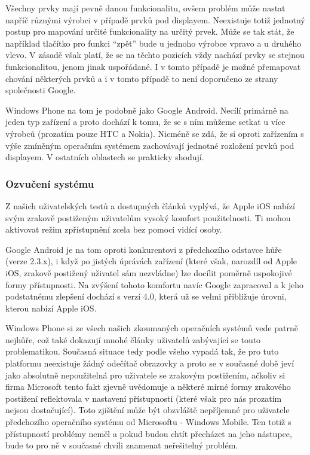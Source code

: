 \documentclass[thesis=M,czech]{FITthesis}[2012/06/26]
\begin{document}
Všechny prvky mají pevně danou funkcionalitu, ovšem problém může nastat napříč různými výrobci v případě prvků pod displayem. Neexistuje totiž jednotný postup pro mapování určité funkcionality na určitý prvek. Může se tak stát, že například tlačítko pro funkci “zpět” bude u jednoho výrobce vpravo a u druhého vlevo. V zásadě však platí, že se na těchto pozicích vždy nachází prvky se stejnou funkcionalitou, jenom jinak uspořádané. I v tomto případě je možné přemapovat chování některých prvků a i v tomto případě to není doporučeno ze strany společnosti Google.

Windows Phone na tom je podobně jako Google Android. Necílí primárně na jeden typ zařízení a proto dochází k tomu, že se s ním můžeme setkat u více výrobců (prozatím pouze HTC a Nokia). Nicméně se zdá, že si oproti zařízením s výše zmíněným operačním systémem zachovávají jednotné rozložení prvků pod displayem. V ostatních oblastech se prakticky shodují.

\subsubsection*{Ozvučení systému}
Z našich uživatelských testů a dostupných článků\cite{ipad_blind}\cite{iphone_blind}\cite{iphone_inside} vyplývá, že Apple iOS nabízí svým zrakově postiženým uživatelům vysoký komfort použitelnosti. Ti mohou aktivovat režim zpřístupnění zcela bez pomoci vidící osoby.

Google Android je na tom oproti konkurentovi z předchozího odstavce hůře (verze 2.3.x), i když po jistých úprávách zařízení (které však, narozdíl od Apple iOS, zrakově postižený uživatel sám nezvládne) lze docílit poměrně uspokojivé formy přístupnosti\cite{android_blind}. Na zvýšení tohoto komfortu navíc Google zapracoval a k jeho podstatnému zlepšení dochází s verzí 4.0, která už se velmi přibližuje úrovni, kterou nabízí Apple iOS\cite{android_start}.

Windows Phone si ze všech našich zkoumaných operačních systémů vede patrně nejhůře, což také dokazují mnohé články\cite{touch_yes_or_no}\cite{win8_blind}\cite{win8_blind2} uživatelů zabývající se touto problematikou. Současná situace tedy podle všeho vypadá tak, že pro tuto platformu neexistuje žádný odečítač obrazovky a proto se v současné době jeví jako absolutně nepoužitelná pro uživatele se zrakovým postižením, ačkoliv si firma Microsoft tento fakt zjevně uvědomuje a některé mírné formy zrakového postižení reflektovala v nastavení přístupnosti\cite{win8_no_reader} (které však pro nás prozatím nejsou dostačující). Toto zjištění může být obzvláště nepříjemné pro uživatele předchozího operačního systému od Microsoftu - Windows Mobile. Ten totiž s přístupností problémy neměl a pokud budou chtít přecházet na jeho nástupce, bude to pro ně v současné chvíli znamenat neřešitelný problém.
\end{document}
